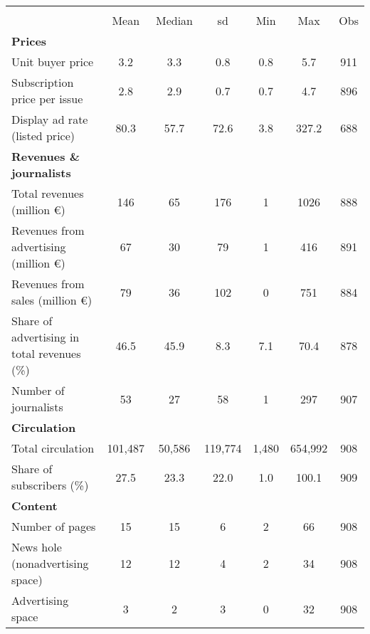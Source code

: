 {
\def\sym#1{\ifmmode^{#1}\else\(^{#1}\)\fi}
\begin{tabular}{l*{1}{cccccc}}
\hline\hline
                    &\multicolumn{6}{c}{}                                                         \\
                    &        Mean&      Median&          sd&         Min&         Max&         Obs\\
\hline
\textbf{Prices}     &            &            &            &            &            &            \\
Unit buyer price    &         3.2&         3.3&         0.8&         0.8&         5.7&         911\\
Subscription price per issue&         2.8&         2.9&         0.7&         0.7&         4.7&         896\\
Display ad rate (listed price)&        80.3&        57.7&        72.6&         3.8&       327.2&         688\\
\textbf{Revenues \& journalists}&            &            &            &            &            &            \\
Total revenues (million \euro)&         146&          65&         176&           1&        1026&         888\\
Revenues from advertising (million \euro)&          67&          30&          79&           1&         416&         891\\
Revenues from sales (million \euro)&          79&          36&         102&           0&         751&         884\\
Share of advertising in total revenues (\%)&        46.5&        45.9&         8.3&         7.1&        70.4&         878\\
Number of journalists&          53&          27&          58&           1&         297&         907\\
\textbf{Circulation}&            &            &            &            &            &            \\
Total circulation   &     101,487&      50,586&     119,774&       1,480&     654,992&         908\\
Share of subscribers (\%)&        27.5&        23.3&        22.0&         1.0&       100.1&         909\\
\textbf{Content}    &            &            &            &            &            &            \\
Number of pages     &          15&          15&           6&           2&          66&         908\\
News hole (nonadvertising space)&          12&          12&           4&           2&          34&         908\\
Advertising space   &           3&           2&           3&           0&          32&         908\\
\hline\hline
\end{tabular}
}
